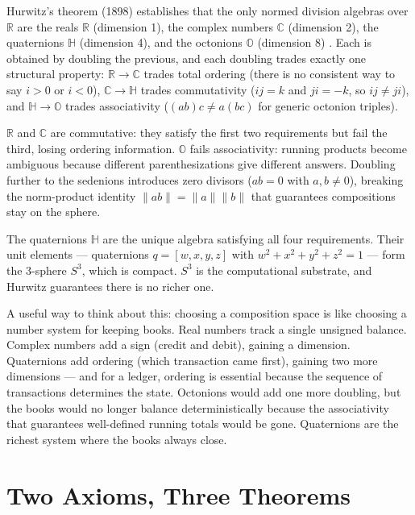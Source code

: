 \documentclass[12pt,a4paper]{article}
\begin{document}
Hurwitz's theorem (1898) establishes that the only normed division algebras over $\mathbb{R}$ are the reals $\mathbb{R}$ (dimension 1), the complex numbers $\mathbb{C}$ (dimension 2), the quaternions $\mathbb{H}$ (dimension 4), and the octonions $\mathbb{O}$ (dimension 8) \cite{hurwitz1898}. Each is obtained by doubling the previous, and each doubling trades exactly one structural property: $\mathbb{R} \to \mathbb{C}$ trades total ordering (there is no consistent way to say $i > 0$ or $i < 0$), $\mathbb{C} \to \mathbb{H}$ trades commutativity ($ij = k$ and $ji = -k$, so $ij \neq ji$), and $\mathbb{H} \to \mathbb{O}$ trades associativity ($(ab)c \neq a(bc)$ for generic octonion triples).

$\mathbb{R}$ and $\mathbb{C}$ are commutative: they satisfy the first two requirements but fail the third, losing ordering information. $\mathbb{O}$ fails associativity: running products become ambiguous because different parenthesizations give different answers. Doubling further to the sedenions introduces zero divisors ($ab = 0$ with $a, b \neq 0$), breaking the norm-product identity $\|ab\| = \|a\|\|b\|$ that guarantees compositions stay on the sphere.

The quaternions $\mathbb{H}$ \cite{hamilton1843} are the unique algebra satisfying all four requirements. Their unit elements --- quaternions $q = [w, x, y, z]$ with $w^2 + x^2 + y^2 + z^2 = 1$ --- form the 3-sphere $S^3$, which is compact. $S^3$ is the computational substrate, and Hurwitz guarantees there is no richer one.

A useful way to think about this: choosing a composition space is like choosing a number system for keeping books. Real numbers track a single unsigned balance. Complex numbers add a sign (credit and debit), gaining a dimension. Quaternions add ordering (which transaction came first), gaining two more dimensions --- and for a ledger, ordering is essential because the sequence of transactions determines the state. Octonions would add one more doubling, but the books would no longer balance deterministically because the associativity that guarantees well-defined running totals would be gone. Quaternions are the richest system where the books always close.


\section{Two Axioms, Three Theorems}
\end{document}
